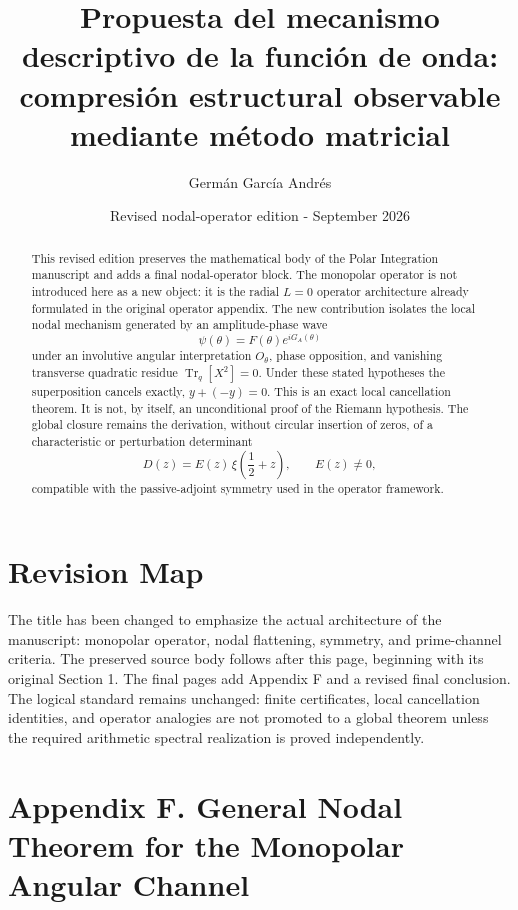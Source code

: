 \documentclass[11pt,letterpaper]{amsart}
\title[Mecanismo descriptivo de la funci\'on de onda]{Propuesta del mecanismo descriptivo de la funci\'on de onda:\\
compresi\'on estructural observable mediante m\'etodo matricial}
\author{Germ\'an Garc\'ia Andr\'es}
\date{Revised nodal-operator edition - September 2026}
\theoremstyle{definition}
\begin{document}
\maketitle

\begin{abstract}
This revised edition preserves the mathematical body of the Polar Integration manuscript and
adds a final nodal-operator block. The monopolar operator is not introduced here as a new
object: it is the radial \(L=0\) operator architecture already formulated in the original
operator appendix. The new contribution isolates the local nodal mechanism generated by an
amplitude-phase wave
\[
  \psi(\theta)=F(\theta)e^{iG_A(\theta)}
\]
under an involutive angular interpretation \(O_\theta\), phase opposition, and vanishing
transverse quadratic residue \(\operatorname{Tr}_q[X^2]=0\). Under these stated hypotheses the
superposition cancels exactly, \(y+(-y)=0\). This is an exact local cancellation theorem. It is
not, by itself, an unconditional proof of the Riemann hypothesis. The global closure remains
the derivation, without circular insertion of zeros, of a characteristic or perturbation
determinant
\[
  D(z)=E(z)\,\xi\!\left(\frac12+z\right),\qquad E(z)\neq 0,
\]
compatible with the passive-adjoint symmetry used in the operator framework.
\end{abstract}

\section*{Revision Map}

The title has been changed to emphasize the actual architecture of the manuscript:
monopolar operator, nodal flattening, symmetry, and prime-channel criteria. The preserved
source body follows after this page, beginning with its original Section 1. The final pages add
Appendix F and a revised final conclusion. The logical standard remains unchanged: finite
certificates, local cancellation identities, and operator analogies are not promoted to a
global theorem unless the required arithmetic spectral realization is proved independently.

\clearpage



\clearpage
\appendix
\section*{Appendix F. General Nodal Theorem for the Monopolar Angular Channel}
\end{document}
